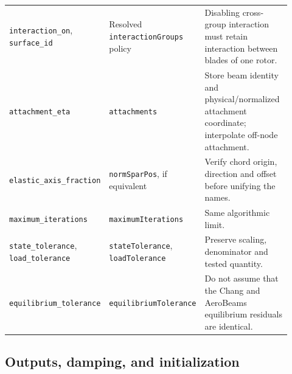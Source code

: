 \documentclass[11pt,a4paper]{article}
\newcommand{\code}{\nolinkurl}
\begin{document}
\begin{longtable}{@{}L{0.29\linewidth}L{0.29\linewidth}L{0.34\linewidth}@{}}
\code{interaction_on}, \code{surface_id} & Resolved
\code{interactionGroups} policy & Disabling cross-group interaction must
retain interaction between blades of one rotor.\\
\code{attachment_eta} & \code{attachments} & Store beam identity and
physical/normalized attachment coordinate; interpolate off-node attachment.\\
\code{elastic_axis_fraction} & \code{normSparPos}, if equivalent &
Verify chord origin, direction and offset before unifying the names.\\
\code{maximum_iterations} & \code{maximumIterations} & Same algorithmic limit.\\
\code{state_tolerance}, \code{load_tolerance} & \code{stateTolerance},
\code{loadTolerance} & Preserve scaling, denominator and tested quantity.\\
\code{equilibrium_tolerance} & \code{equilibriumTolerance} &
Do not assume that the Chang and AeroBeams equilibrium residuals are identical.\\
\bottomrule
\end{longtable}
\endgroup

\subsection{Outputs, damping, and initialization}
\end{document}
